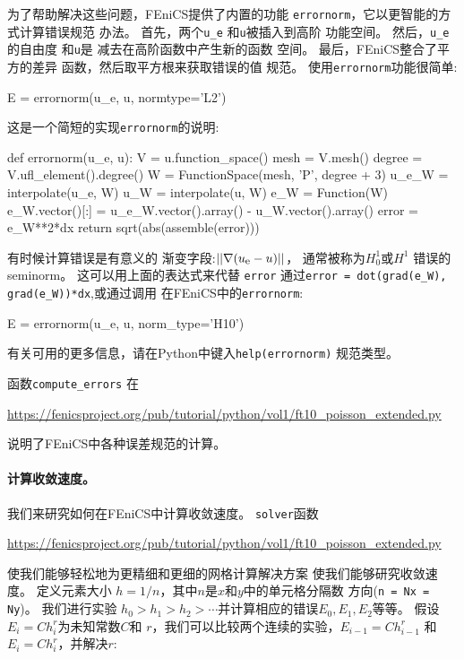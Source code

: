 为了帮助解决这些问题，FEniCS提供了内置的功能
\texttt{errornorm}，它以更智能的方式计算错误规范
办法。 首先，两个\verb!u_e! 和\texttt{u}被插入到高阶
功能空间。 然后，\verb!u_e!的自由度 和\texttt{u}是
减去在高阶函数中产生新的函数
空间。 最后，FEniCS整合了平方的差异
函数，然后取平方根来获取错误的值
规范。 使用\texttt{errornorm}功能很简单:

\begin{python}
E = errornorm(u_e, u, normtype='L2')
\end{python}
这是一个简短的实现\texttt{errornorm}的说明:

\begin{python}
def errornorm(u_e, u):
    V = u.function_space()
    mesh = V.mesh()
    degree = V.ufl_element().degree()
    W = FunctionSpace(mesh, 'P', degree + 3)
    u_e_W = interpolate(u_e, W)
    u_W = interpolate(u, W)
    e_W = Function(W)
    e_W.vector()[:] = u_e_W.vector().array() - u_W.vector().array()
    error = e_W**2*dx
    return sqrt(abs(assemble(error)))
\end{python}

有时候计算错误是有意义的
渐变字段:$||\nabla(u_{\mbox{\footnotesize e}}-u)||$，
通常被称为$H^1_0$或$H^1$
错误的seminorm。
这可以用上面的表达式来代替
\texttt{error} 通过\verb!error = dot(grad(e_W), grad(e_W))*dx!,或通过调用
在FEniCS中的\texttt{errornorm}:

\begin{python}
E = errornorm(u_e, u, norm_type='H10')
\end{python}
有关可用的更多信息，请在Python中键入\texttt{help(errornorm)}
规范类型。

函数\verb!compute_errors! 在
\begin{center}
\url{https://fenicsproject.org/pub/tutorial/python/vol1/ft10_poisson_extended.py}
\end{center}
说明了FEniCS中各种误差规范的计算。

\paragraph{计算收敛速度。}
我们来研究如何在FEniCS中计算收敛速度。
\texttt{solver}函数
\begin{center}
\url{https://fenicsproject.org/pub/tutorial/python/vol1/ft10_poisson_extended.py}
\end{center}
使我们能够轻松地为更精细和更细的网格计算解决方案
使我们能够研究收敛速度。 定义元素大小
$h=1/n$，其中$n$是$x$和$y$中的单元格分隔数
方向(\texttt{n = Nx = Ny})。 我们进行实验
$h_0>h_1>h_2>\cdots$并计算相应的错误$E_0, E_1,
E_2$等等。 假设$E_i=Ch_i^r$为未知常数$C$和
$r$，我们可以比较两个连续的实验，$E_{i-1}=Ch_{i-1}^r$
和$E_i=Ch_i^r$，并解决$r$:

